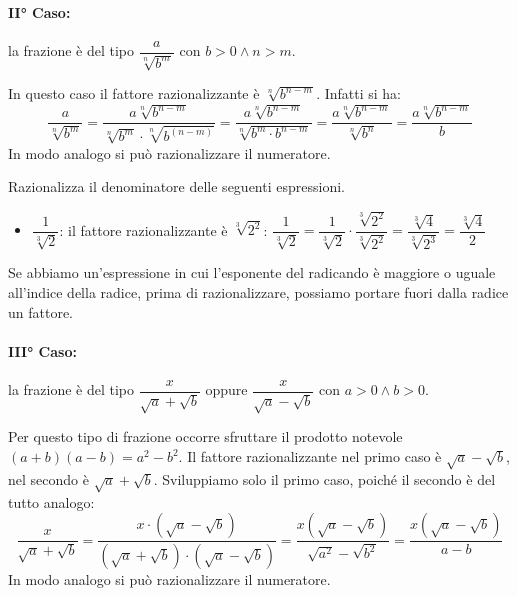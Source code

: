\paragraph{II° Caso:}
la frazione è del tipo \(\dfrac a{\sqrt[n]{b^m}}\) con \(b>0 \wedge n>m\).

In questo caso il fattore razionalizzante è \(\sqrt[n]{b^{n-m}}\). Infatti 
si ha:
\begin{equation*}
\dfrac a{\sqrt[n]{b^m}}=
\dfrac{a\sqrt[n]{b^{n-m}}}{\sqrt[n]{b^m}\cdot \sqrt[n]{b^{(n-m)}}}=
\dfrac{a\sqrt[n]{b^{n-m}}}{\sqrt[n]{b^m\cdot b^{n-m}}}=
\dfrac{a\sqrt[n]{b^{n-m}}}{\sqrt[n]{b^n}}=\dfrac{a\sqrt[n]{b^{n-m}}} b
\end{equation*}
In modo analogo si può razionalizzare il numeratore. 

\begin{esempio}{}{}
Razionalizza il denominatore delle seguenti espressioni.
\begin{itemize} [left=0mm]
\item \(\dfrac 1{\sqrt[3]2}\): il fattore razionalizzante è 
\(\sqrt[3]{2^2}\): \quad 
\(\dfrac{1}{\sqrt[3]2} =
\dfrac{1}{\sqrt[3]2} \cdot  \dfrac{\sqrt[3]{2^2}}{\sqrt[3]{2^2}} =
\dfrac{\sqrt[3]4}{\sqrt[3]{2^3}} = \dfrac{\sqrt[3]4} 2\)
\end{itemize}
\end{esempio}

Se abbiamo un'espressione in cui l'esponente del radicando è maggiore o 
uguale all'indice della radice, prima di razionalizzare, possiamo portare 
fuori dalla radice un fattore.


\paragraph{III° Caso:} 
la frazione è del tipo \(\dfrac x{\sqrt a+\sqrt b}\) 
oppure \(\dfrac x{\sqrt a-\sqrt b}\) con \(a>0 \wedge b>0\).

Per questo tipo di frazione occorre sfruttare il prodotto notevole 
\((a+b)(a-b)=a^2-b^2\). Il fattore razionalizzante nel primo caso è \(\sqrt 
a-\sqrt b\), nel secondo è \(\sqrt a+\sqrt b\).
Sviluppiamo solo il primo caso, poiché il secondo è del tutto analogo:
\begin{equation*}
\dfrac x{\sqrt a+\sqrt b}=
\dfrac{x\cdot (\sqrt a-\sqrt b)}{(\sqrt a+\sqrt b)\cdot (\sqrt a-\sqrt b)}=
\dfrac{x(\sqrt a-\sqrt b)}{\sqrt{a^2}-\sqrt{b^2}}=
\dfrac{x(\sqrt a-\sqrt b)}{a-b}
\end{equation*}
In modo analogo si può razionalizzare il numeratore. 

